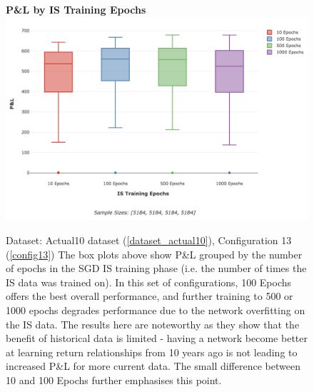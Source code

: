 \documentclass[a4paper,11pt,oneside]{article}
\theoremstyle{plain}
\theoremstyle{definition}
\begin{document}
	
	
	\begin{figure}[H]
		\centering 
		\textbf{P\&L by IS Training Epochs}
		\includegraphics[scale=0.4]{images/results/data/max_epochs.png}
		\caption[P\&L by IS Training Epochs]{
			Dataset: Actual10 dataset (\ref{dataset_actual10}), Configuration 13 (\ref{config13}) 
			\newline The box plots above show P\&L grouped by the number of epochs in the SGD IS training phase (i.e. the number of times the IS data was trained on). In this set of configurations, 100 Epochs offers the best overall performance, and further training to 500 or 1000 epochs degrades performance due to the network overfitting on the IS data. The results here are noteworthy as they show that the benefit of historical data is limited - having a network become better at learning return relationships from 10 years ago is not leading to increased P\&L for more current data. The small difference between 10 and 100 Epochs further emphasises this point.
		}
		\label{figure-results_pl_max_epochs}
	\end{figure}
	
\end{document}
